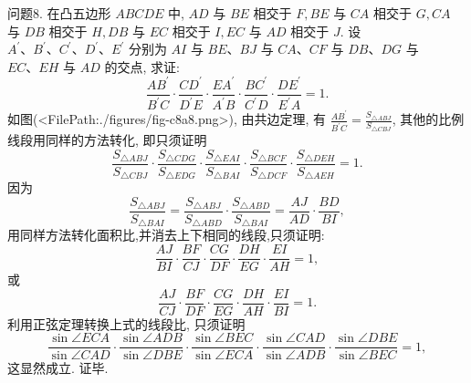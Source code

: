 问题8. 在凸五边形 $A B C D E$ 中, $A D$ 与 $B E$ 相交于 $F, B E$ 与 $C A$ 相交于 $G, C A$ 与 $D B$ 相交于 $H, D B$ 与 $E C$ 相交于 $I, E C$ 与 $A D$ 相交于 $J$. 设 $A^{\prime} 、 B^{\prime} 、 C^{\prime} 、 D^{\prime} 、 E^{\prime}$ 分别为 $A I$ 与 $B E 、 B J$ 与 $C A 、 C F$ 与 $D B 、 D G$ 与 $E C 、 E H$ 与 $A D$ 的交点, 求证:
$$
\frac{A B^{\prime}}{B^{\prime} C} \cdot \frac{C D^{\prime}}{D^{\prime} E} \cdot \frac{E A^{\prime}}{A^{\prime} B} \cdot \frac{B C^{\prime}}{C^{\prime} D} \cdot \frac{D E^{\prime}}{E^{\prime} A}=1 .
$$
如图(<FilePath:./figures/fig-c8a8.png>), 由共边定理, 有 $\frac{A B^{\prime}}{B^{\prime} C}=\frac{S_{\triangle A B J}}{S_{\triangle C B J}}$, 其他的比例线段用同样的方法转化, 即只须证明
$$
\frac{S_{\triangle A B J}}{S_{\triangle C B J}} \cdot \frac{S_{\triangle C D G}}{S_{\triangle E D G}} \cdot \frac{S_{\triangle E A I}}{S_{\triangle B A I}} \cdot \frac{S_{\triangle B C F}}{S_{\triangle D C F}} \cdot \frac{S_{\triangle D E H}}{S_{\triangle A E H}}=1 .
$$
因为
$$
\frac{S_{\triangle A B J}}{S_{\triangle B A I}}=\frac{S_{\triangle A B J}}{S_{\triangle A B D}} \cdot \frac{S_{\triangle A B D}}{S_{\triangle B A I}}=\frac{A J}{A D} \cdot \frac{B D}{B I},
$$
用同样方法转化面积比,并消去上下相同的线段,只须证明:
$$
\frac{A J}{B I} \cdot \frac{B F}{C J} \cdot \frac{C G}{D F} \cdot \frac{D H}{E G} \cdot \frac{E I}{A H}=1,
$$
或
$$
\frac{A J}{C J} \cdot \frac{B F}{D F} \cdot \frac{C G}{E G} \cdot \frac{D H}{A H} \cdot \frac{E I}{B I}=1 .
$$
利用正弦定理转换上式的线段比, 只须证明
$$
\frac{\sin \angle E C A}{\sin \angle C A D} \cdot \frac{\sin \angle A D B}{\sin \angle D B E} \cdot \frac{\sin \angle B E C}{\sin \angle E C A} \cdot \frac{\sin \angle C A D}{\sin \angle A D B} \cdot \frac{\sin \angle D B E}{\sin \angle B E C}=1,
$$
这显然成立.
证毕.


